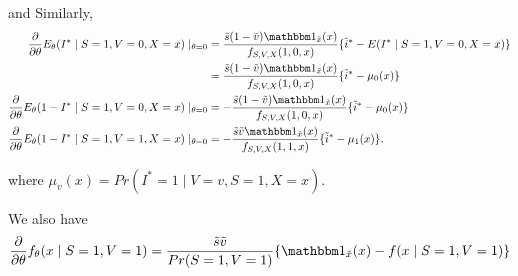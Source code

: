 \documentclass{article}
\begin{document}
and Similarly,
\begin{align*}
    \dfrac{\partial}{\partial\theta}E_\theta(I^*\mid S=1, V=0, X=x)\mid_{\theta=0} &= \dfrac{\tilde s(1-\tilde v)\mathbbm 1_{\tilde x}(x)}{f_{S, V, X}(1, 0, x)}\{\tilde i^* - E(I^*\mid S=1, V=0, X=x)\}\\
    &= \dfrac{\tilde s(1-\tilde v)\mathbbm 1_{\tilde x}(x)}{f_{S, V, X}(1, 0, x)}\{\tilde i^* - \mu_0(x)\}\\
     \dfrac{\partial}{\partial\theta}E_\theta(1-I^*\mid S=1, V=0, X=x)\mid_{\theta=0} &= -\dfrac{\tilde s(1-\tilde v)\mathbbm 1_{\tilde x}(x)}{f_{S, V, X}(1, 0, x)}\{\tilde i^* - \mu_0(x)\}\\
     \dfrac{\partial}{\partial\theta}E_\theta(1-I^*\mid S=1, V=1, X=x)\mid_{\theta=0} &= -\dfrac{\tilde s\tilde v\mathbbm 1_{\tilde x}(x)}{f_{S, V, X}(1, 1, x)}\{\tilde i^* - \mu_1(x)\}.
\end{align*}

where $\mu_v(x)=Pr(I^*=1\mid V=v, S=1, X=x)$.

We also have
$$\dfrac{\partial}{\partial\theta}f_\theta(x\mid S=1, V=1) = \dfrac{\tilde s \tilde v}{Pr(S=1, V=1)}\{\mathbbm 1_{\tilde x}(x)-f(x\mid S=1, V=1)\}$$
\end{document}
